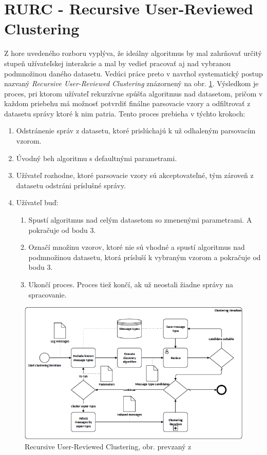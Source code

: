 \section{RURC - Recursive User-Reviewed Clustering}
Z hore uvedeného rozboru vyplýva, že ideálny algoritmus by mal zahrňovať určitý stupeň užívateľskej interakcie a mal by vedieť pracovať aj nad vybranou podmnožinou daného datasetu. Vedúci práce preto v \parencite{Tovarnak2017} navrhol systematický postup nazvaný \emph{Recursive User-Reviewed Clustering} znázornený na obr. \ref{fig:rurc}. Výsledkom je proces, pri ktorom užívateľ rekurzívne spúšťa algoritmus nad datasetom, pričom v každom priebehu má možnosť potvrdiť finálne parsovacie vzory a odfiltrovať z datasetu správy ktoré k nim patria. Tento proces prebieha v týchto krokoch:

\begin{enumerate}
  \item Odstránenie správ z datasetu, ktoré prislúchajú k už odhaleným parsovacím vzorom.
  \item Úvodný beh algoritmu s defaultnými parametrami.
  \item Užívateľ rozhodne, ktoré parsovacie vzory sú akceptovateľné, tým zároveň z datasetu odstráni príslušné správy.
  \item Užívateľ buď:
  	\begin{enumerate}
   		 \item Spustí algoritmus nad celým datasetom so zmenenými parametrami. A pokračuje od bodu 3.
   		 \item Označí množinu vzorov, ktoré nie sú vhodné a spustí algoritmus nad podmnožinou datasetu, ktorá prísluší k vybraným vzorom a 				pokračuje od bodu 3.
   		 \item Ukončí proces. Proces tiež končí, ak už neostali žiadne správy na spracovanie.
 	 \end{enumerate}
\end{enumerate}

\begin{figure}[htbp]
 \centering 
 \begin{minipage}{0.95\linewidth}
 	\centering
 	\includegraphics[width=\textwidth]{images/RURC.png} 	
 \end{minipage}
  \caption{Recursive User-Reviewed Clustering, obr. prevzaný z  \parencite{Tovarnak2017}}
  \label{fig:rurc}
\end{figure}


